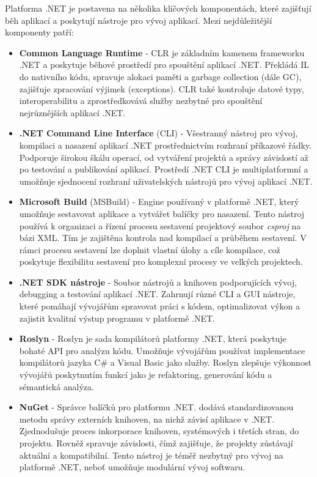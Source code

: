 
Platforma .NET je postavena na několika klíčových komponentách, které zajišťují běh aplikací a poskytují nástroje pro vývoj aplikací. Mezi nejdůležitější komponenty patří:

\begin{itemize}
    \item \textbf{Common Language Runtime} - CLR je základním kamenem frameworku .NET a poskytuje běhové prostředí pro spouštění aplikací .NET. Překládá IL do nativního kódu, spravuje alokaci paměti a garbage collection (dále GC), zajišťuje zpracování výjimek (exceptions). CLR také kontroluje datové typy, interoperabilitu a zprostředkovává služby nezbytné pro spouštění nejrůznějších aplikací .NET.
    \item \textbf{.NET Command Line Interface} (CLI) - Všestranný nástroj pro vývoj, kompilaci a nasazení aplikací .NET prostřednictvím rozhraní příkazové řádky. Podporuje širokou škálu operací, od vytváření projektů a správy závislostí až po testování a publikování aplikací. Prostředí .NET CLI je multiplatformní a umožňuje sjednocení rozhraní uživatelských nástrojů pro vývoj aplikací .NET.
    \item \textbf{Microsoft Build} (MSBuild) - Engine používaný v platformě .NET, který umožňuje sestavovat aplikace a vytvářet balíčky pro nasazení. Tento nástroj používá k organizaci a řízení procesu sestavení projektový soubor \emph{csproj} na bázi XML. Tím je zajištěna kontrola nad kompilací a průběhem sestavení. V rámci procesu sestavení lze doplnit vlastní úlohy a cíle kompilace, což poskytuje flexibilitu sestavení pro komplexní procesy ve velkých projektech.
    \item \textbf{.NET SDK nástroje} - Soubor nástrojů a knihoven podporujících vývoj, debugging a testování aplikací .NET. Zahrnují různé CLI a GUI nástroje, které pomáhají vývojářům spravovat práci s kódem, optimalizovat výkon a zajistit kvalitní výstup programu v platformě .NET.
    \item \textbf{Roslyn} - Roslyn je sada kompilátorů platformy .NET, která poskytuje bohaté API pro analýzu kódu. Umožňuje vývojářům používat implementace kompilátorů jazyka C\# a Visual Basic jako služby. Roslyn zlepšuje výkonnost vývojářů poskytnutím funkcí jako je refaktoring, generování kódu a sémantická analýza.
    \item \textbf{NuGet} - Správce balíčků pro platformu .NET. dodává standardizovanou metodu správy externích knihoven, na nichž závisí aplikace v .NET. Zjednodušuje proces inkorporace knihoven, systémových i třetích stran, do projektu. Rovněž spravuje závislosti, čímž zajišťuje, že projekty zůstávají aktuální a kompatibilní. Tento nástroj je téměř nezbytný pro vývoj na platformě .NET, neboť umožňuje modulární vývoj softwaru.
\end{itemize}

